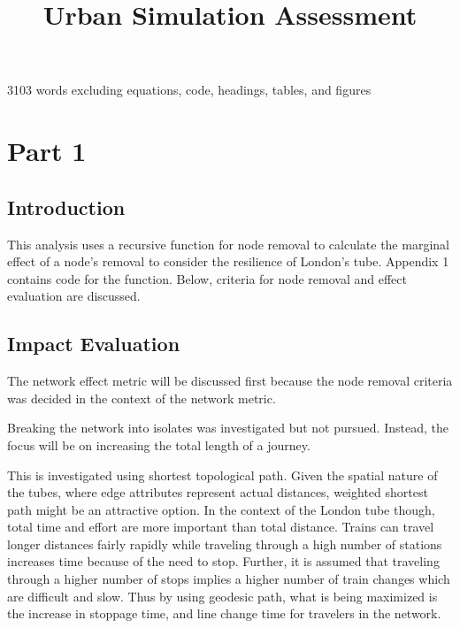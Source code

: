 \documentclass[11pt]{article} %
\title{\vspace{-3.0cm}Urban Simulation Assessment}
\begin{document}
\maketitle


3103 words excluding equations, code, headings, tables, and figures


\section{Part 1}



\subsection{Introduction}

This analysis uses a recursive function for node removal to calculate the marginal effect of a node's removal to consider the resilience of London's tube. Appendix 1 contains code for the function. Below, criteria for node removal and effect evaluation are discussed. 


\subsection{Impact Evaluation}
The network effect metric will be discussed first because the node removal criteria was decided in the context of the network metric.

Breaking the network into isolates was investigated but not pursued. Instead, the focus will be on increasing the total length of a journey. 

This is investigated using shortest topological path. Given the spatial nature of the tubes, where edge attributes represent actual distances, weighted shortest path might be an attractive option. In the context of the London tube though, total time and effort are more important than total distance. Trains can travel longer distances fairly rapidly while traveling through a high number of stations increases time because of the need to stop. Further, it is assumed that traveling through a higher number of stops implies a higher number of train changes which are difficult and slow. Thus by using geodesic path, what is being maximized is the increase in stoppage time, and line change time for travelers in the network.
\end{document}
